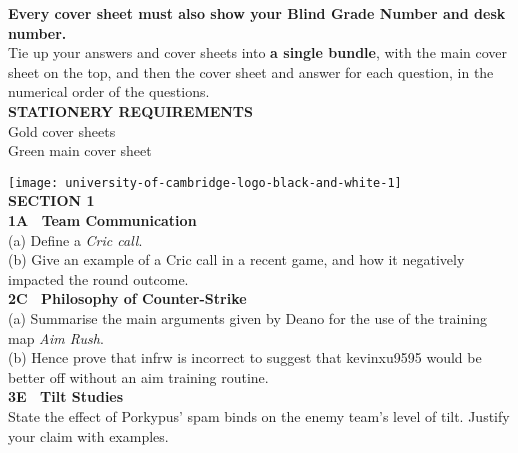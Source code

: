 \documentclass{article}
\begin{document}
\textbf{Every cover sheet must also show your Blind Grade Number and desk
number.}\vspace{5pt}\\
Tie up your answers and cover sheets into \textbf{a single bundle}, with the main cover
sheet on the top, and then the cover sheet and answer for each question, in the
numerical order of the questions.\vspace{10pt}\\
\textbf{STATIONERY REQUIREMENTS} \\
Gold cover sheets \\
Green main cover sheet
\vspace{3pt}\\
\begin{center}
\end{center}
\newpage
\noindent \texttt{[image: university-of-cambridge-logo-black-and-white-1]}
\\ \textbf{\large SECTION 1}
\vspace{5pt}\\ 
\textbf{1A \ Team Communication}
\vspace{5pt} \\ (a) Define a \emph{Cric call}.
\vspace{5pt} \\ (b) Give an example of a Cric call in a recent game, and how it negatively impacted the round outcome.
\vspace{15pt} \\
\textbf{2C \ Philosophy of Counter-Strike}
\vspace{5pt} \\ (a) Summarise the main arguments given by Deano for the use of the training map \emph{Aim Rush}.
\vspace{5pt} \\ (b) Hence prove that infrw is incorrect to suggest that kevinxu9595 would be better off without an aim training routine.
\vspace{15pt} \\
\textbf{3E \ Tilt Studies}
\vspace{5pt} \\ State the effect of Porkypus' spam binds on the enemy team's level of tilt. Justify your claim with examples.
\vspace{15pt} \\
\end{document}

